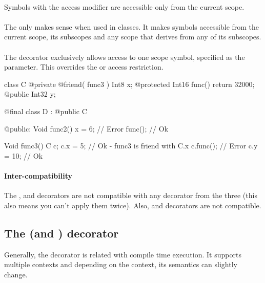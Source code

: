 \paragraph{} \label{decorator:private} Symbols with the  access modifier are accessible only from the current scope.

\paragraph{} \label{decorator:protected} The  only makes sense when used in classes. It makes symbols accessible from the current scope, its subscopes and any scope that derives from any of its subscopes.

\paragraph{} \label{decorator:friend} The  decorator exclusively allows access to one scope symbol, specified as the parameter. This overrides the  or  access restriction.

\begin{code}
class C {
	@private @friend( func3 ) Int8 x;
	@protected Int16 func() {
		return 32000;
	}	
	@public Int32 y;
}

@final class D : @public C {
	
@public:
	Void func2() {
		x = 6; // Error
		func(); // Ok
	}
	
}

Void func3() {
	C c;
	c.x = 5; // Ok - func3 is friend with C.x
	c.func(); // Error
	c.y = 10; // Ok
}
\end{code}

\paragraph{Inter-compatibility}
The ,  and  decorators are not compatible with any decorator from the three (this also means you can't apply them twice). Also,  and  decorators are not compatible.

\subsection{The  (and ) decorator} \label{decorator:ctime}
Generally, the  decorator is related with compile time execution. It supports multiple contexts and depending on the context, its semantics can slightly change.

